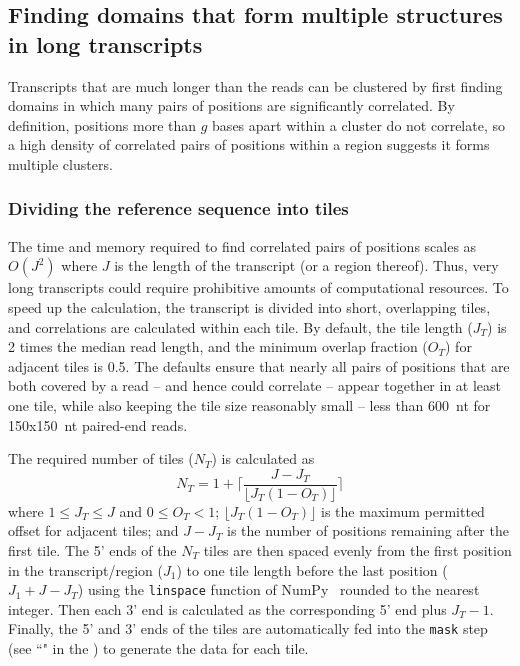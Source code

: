 \documentclass[11pt]{article}
\begin{document}
\subsection{Finding domains that form multiple structures in long transcripts}
\label{long-transcript-clustering}

Transcripts that are much longer than the reads can be clustered by first finding domains in which many pairs of positions are significantly correlated.
By definition, positions more than $g$ bases apart within a cluster do not correlate, so a high density of correlated pairs of positions within a region suggests it forms multiple clusters.

\subsubsection{Dividing the reference sequence into tiles}

The time and memory required to find correlated pairs of positions scales as $O(J^2)$ where $J$ is the length of the transcript (or a region thereof).
Thus, very long transcripts could require prohibitive amounts of computational resources.
To speed up the calculation, the transcript is divided into short, overlapping tiles, and correlations are calculated within each tile.
By default, the tile length ($J_T$) is 2 times the median read length, and the minimum overlap fraction ($O_T$) for adjacent tiles is 0.5.
The defaults ensure that nearly all pairs of positions that are both covered by a read -- and hence could correlate -- appear together in at least one tile, while also keeping the tile size reasonably small -- less than 600~nt for 150x150~nt paired-end reads.

The required number of tiles ($N_T$) is calculated as
$$N_T = 1 + \lceil \frac{J - J_T}{\lfloor J_T (1 - O_T) \rfloor} \rceil$$
where $1 \le J_T \le J$ and $0 \le O_T < 1$; $\lfloor J_T (1 - O_T) \rfloor$ is the maximum permitted offset for adjacent tiles; and $J - J_T$ is the number of positions remaining after the first tile.
The 5' ends of the $N_T$ tiles are then spaced evenly from the first position in the transcript/region ($J_1$) to one tile length before the last position ($J_1 + J - J_T$) using the \verb|linspace| function of NumPy~\cite{Harris2020} rounded to the nearest integer.
Then each 3' end is calculated as the corresponding 5' end plus $J_T - 1$.
Finally, the 5' and 3' ends of the tiles are automatically fed into the \verb|mask| step (see ``" in the ) to generate the data for each tile.
\end{document}

